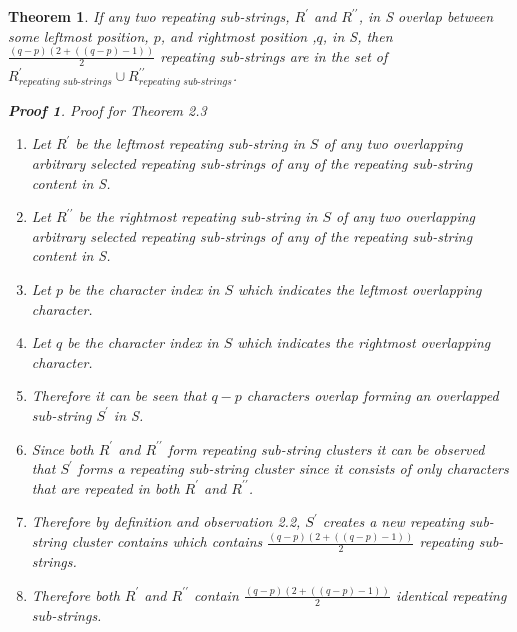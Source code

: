 \documentclass[12pt]{article}
\newtheorem{thm}{Theorem}[section]
\newtheorem{prf}{Proof}[section]
\begin{document}
\begin{flushleft}
	\begin{thm}
	If any two repeating sub-strings, $R^{\prime}$ and $R^{\prime\prime}$, in S overlap between some leftmost position, $p$, and rightmost position ,$q$, in S, then $\frac{(q - p)(2 + ((q - p)-1))}{2}$ repeating sub-strings are in the set of $R^{\prime}_{\textit{repeating sub-strings}} \cup R^{\prime\prime}_{\textit{repeating sub-strings}}$.
		\begin{prf} Proof for Theorem 2.3
			\begin{enumerate}
				\item Let $R^{\prime}$ be the leftmost repeating sub-string in $S$ of any two overlapping arbitrary selected repeating sub-strings of any of the repeating sub-string content in S.  
				\item Let $R^{\prime\prime}$ be the rightmost repeating sub-string in $S$ of any two overlapping arbitrary selected repeating sub-strings of any of the repeating sub-string content in S.
				\item Let $p$ be the character index in $S$ which indicates the leftmost overlapping character.
				\item Let $q$ be the character index in $S$ which indicates the rightmost overlapping character.
				\item Therefore it can be seen that $q - p$ characters overlap forming an overlapped sub-string $S^{\prime}$ in S.
				\item Since both $R^{\prime}$ and $R^{\prime\prime}$ form repeating sub-string clusters it can be observed that $S^{\prime}$ forms a repeating sub-string cluster since it consists of only characters that are repeated in both $R^{\prime}$ and $R^{\prime\prime}$.
				\item Therefore by definition and observation 2.2, $S^{\prime}$ creates a new repeating sub-string cluster contains which contains $\frac{(q - p)(2 + ((q - p)-1))}{2}$ repeating sub-strings.
				\item Therefore both $R^{\prime}$ and $R^{\prime\prime}$ contain $\frac{(q - p)(2 + ((q - p)-1))}{2}$ identical repeating sub-strings.
			\end{enumerate}
		\end{prf}
	\end{thm}
	

\end{flushleft}
\end{document}
